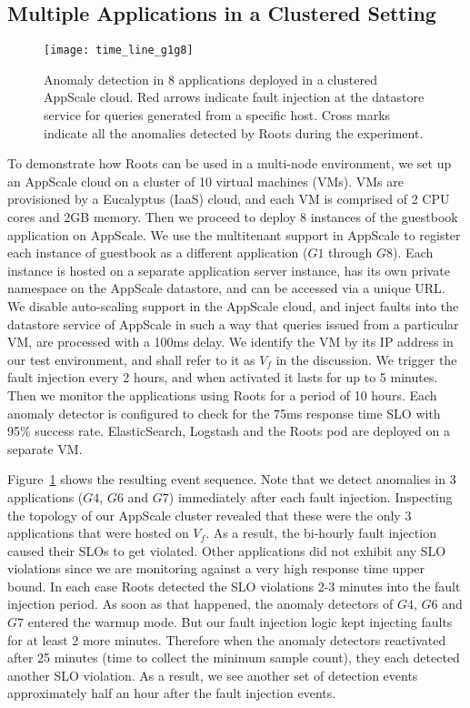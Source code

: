 \subsection{Multiple Applications in a Clustered Setting}
\begin{figure}
\centering
\texttt{[image: time\_line\_g1g8]}
\caption{Anomaly detection in 8 applications deployed in a clustered AppScale cloud. Red arrows
indicate fault injection at the datastore service for queries generated from a specific host. Cross
marks indicate all the anomalies detected by Roots during the experiment.}
\label{fig:time_line_g1g8}
\end{figure}

To demonstrate how Roots can be used in a multi-node environment, we set up an AppScale cloud
on a cluster of 10 virtual machines (VMs). VMs are provisioned by a Eucalyptus (IaaS)
cloud, and each VM is comprised of 2 CPU cores and 2GB memory. Then we proceed
to deploy 8 instances of the guestbook application on AppScale. We use the multitenant support
in AppScale to register each instance of guestbook as a different application ($G1$ through $G8$). 
Each instance
is hosted on a separate application server instance, has its own private namespace on the AppScale
datastore, and can be accessed via a unique URL. We disable auto-scaling support in 
the AppScale cloud, and inject faults into the datastore service of AppScale in such a way that queries
issued from a particular VM, are processed with a 100ms delay. We identify the VM by its IP address
in our test environment, and shall refer to it as $V_f$ in the discussion. We trigger
the fault injection every 2 hours, and when activated it lasts for up to 5 minutes. Then we monitor
the applications using Roots for a period of 10 hours. Each anomaly detector is configured
to check for the 75ms response time SLO with 95\% success rate. 
ElasticSearch, Logstash and the Roots pod are deployed on a separate VM. 

Figure~\ref{fig:time_line_g1g8} shows the resulting event sequence. Note that we detect anomalies 
in 3 applications ($G4$, $G6$ and $G7$) immediately after each fault injection. Inspecting the 
topology of our AppScale cluster revealed that these were the only 3 applications that were 
hosted on $V_f$. As a result, the bi-hourly fault injection caused their SLOs to
get violated. Other applications did not exhibit any SLO violations since we are monitoring against
a very high response time upper bound. In each case Roots detected the SLO violations 2-3 minutes into the fault injection
period. As soon as that happened, the anomaly detectors of $G4$, $G6$ and $G7$ entered the warmup mode.
But our fault injection logic kept injecting faults for at least 2 more minutes. Therefore when the anomaly detectors
reactivated after 25 minutes (time to collect the minimum sample count), they each detected another SLO
violation. As a result, we see another set of detection events approximately half an hour after the
fault injection events.

